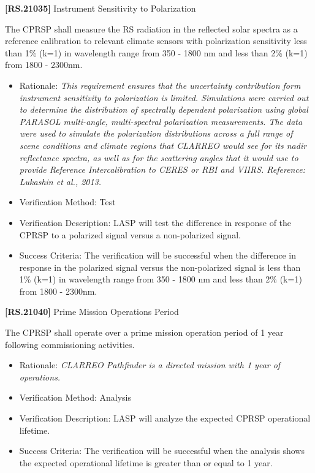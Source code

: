 \textbf{[RS.21035]} Instrument Sensitivity to Polarization

The \gls{CPRSP} shall \gls{measure} the \gls{RS} radiation in the reflected solar spectra as a reference calibration to relevant climate sensors with polarization sensitivity less than 1\% (k=1) in wavelength range from 350 - 1800 nm and less than 2\% (k=1) from 1800 - 2300nm.

\begin{itemize}
\item{} Rationale: \emph{This requirement ensures that the uncertainty contribution form instrument sensitivity to polarization is limited. Simulations were carried out to determine the distribution of spectrally dependent polarization using global PARASOL multi-angle, multi-spectral polarization measurements. The data were used to simulate the polarization distributions across a full range of scene conditions and climate regions that CLARREO would see for its nadir reflectance spectra, as well as for the scattering angles that it would use to provide Reference Intercalibration to CERES or RBI and VIIRS. Reference: Lukashin et al., 2013.}

\item{} Verification Method: Test

\item{} Verification Description: \gls{LASP} will \gls{test} the difference in response of the \gls{CPRSP} to a polarized signal versus a non-polarized signal.

\item{} Success Criteria: The verification will be successful when the difference in response in the polarized signal versus the non-polarized signal is less than 1\% (k=1) in wavelength range from 350 - 1800 nm and less than 2\% (k=1) from 1800 - 2300nm.

\end{itemize}

\textbf{[RS.21040]} Prime Mission Operations Period

The \gls{CPRSP} shall operate over a prime mission operation period of 1 year following commissioning activities.

\begin{itemize}
\item{} Rationale: \emph{CLARREO Pathfinder is a directed mission with 1 year of operations.}

\item{} Verification Method: Analysis

\item{} Verification Description: \gls{LASP} will analyze the expected \gls{CPRSP} operational lifetime.

\item{} Success Criteria: The verification will be successful when the \gls{analysis} shows the expected operational lifetime is greater than or equal to 1 year.

\end{itemize}

